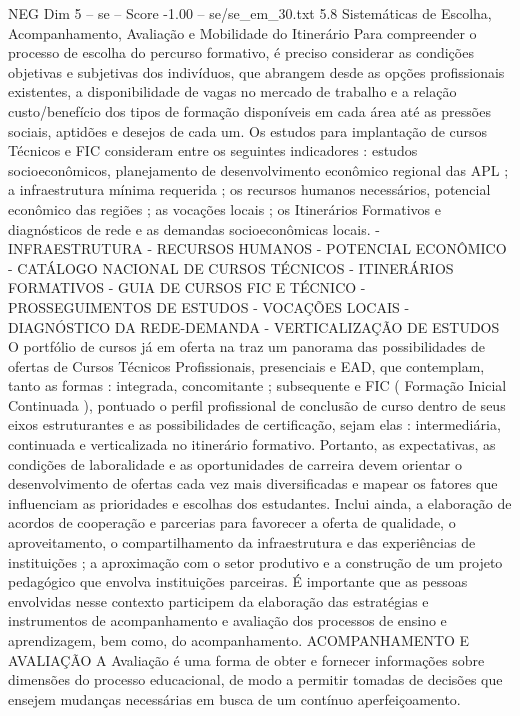 \begin{textsample}{NEG Dim 5 – se – Score -1.00 – se/se\_em\_30.txt}  \label{ex:f5_neg_153}
5.8 Sistemáticas de Escolha, Acompanhamento, Avaliação e Mobilidade do Itinerário Para compreender o processo de escolha do percurso formativo, é preciso considerar as condições objetivas e subjetivas dos indivíduos, que abrangem desde as opções profissionais existentes, a disponibilidade de vagas no mercado de trabalho e a relação custo/benefício dos tipos de formação disponíveis em cada área até as pressões sociais, aptidões e desejos de cada um.
Os estudos para implantação de cursos Técnicos e FIC consideram entre os seguintes indicadores : estudos socioeconômicos, planejamento de desenvolvimento econômico regional das APL ; a infraestrutura mínima requerida ; os recursos humanos necessários, potencial econômico das regiões ; as vocações locais ; os Itinerários Formativos e diagnósticos de rede e as demandas socioeconômicas locais. - INFRAESTRUTURA - RECURSOS HUMANOS - POTENCIAL ECONÔMICO - CATÁLOGO NACIONAL DE CURSOS TÉCNICOS - ITINERÁRIOS FORMATIVOS - GUIA DE CURSOS FIC E TÉCNICO - PROSSEGUIMENTOS DE ESTUDOS - VOCAÇÕES LOCAIS - DIAGNÓSTICO DA REDE-DEMANDA - VERTICALIZAÇÃO DE ESTUDOS O portfólio de cursos já em oferta na traz um panorama das possibilidades de ofertas de Cursos Técnicos Profissionais, presenciais e EAD, que contemplam, tanto as formas : integrada, concomitante ; subsequente e FIC ( Formação Inicial Continuada ), pontuado o perfil profissional de conclusão de curso dentro de seus eixos estruturantes e as possibilidades de certificação, sejam elas : intermediária, continuada e verticalizada no itinerário formativo.
Portanto, as expectativas, as condições de laboralidade e as oportunidades de carreira devem orientar o desenvolvimento de ofertas cada vez mais diversificadas e mapear os fatores que influenciam as prioridades e escolhas dos estudantes.
Inclui ainda, a elaboração de acordos de cooperação e parcerias para favorecer a oferta de qualidade, o aproveitamento, o compartilhamento da infraestrutura e das experiências de instituições ; a aproximação com o setor produtivo e a construção de um projeto pedagógico que envolva instituições parceiras.
É importante que as pessoas envolvidas nesse contexto participem da elaboração das estratégias e instrumentos de acompanhamento e avaliação dos processos de ensino e aprendizagem, bem como, do acompanhamento.
ACOMPANHAMENTO E AVALIAÇÃO A Avaliação é uma forma de obter e fornecer informações sobre dimensões do processo educacional, de modo a permitir tomadas de decisões que ensejem mudanças necessárias em busca de um contínuo aperfeiçoamento.

\end{textsample}
